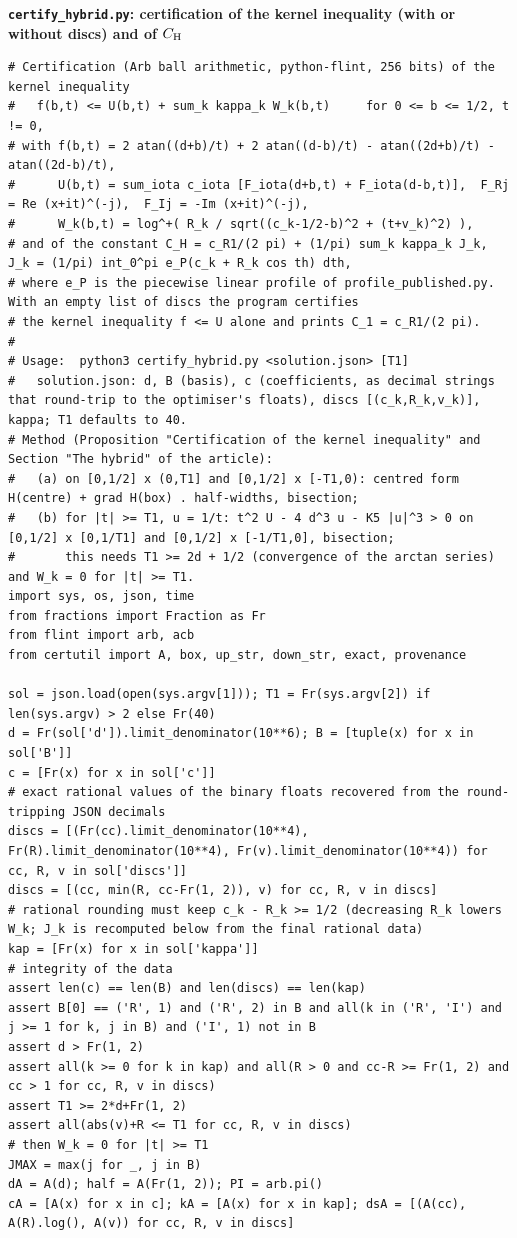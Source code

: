 \documentclass[11pt,reqno]{amsart}
\numberwithin{equation}{section}
\theoremstyle{definition}
\theoremstyle{remark}
\newcommand{\appsub}[1]{\par\medskip\noindent\textbf{#1}\par\nobreak\smallskip}
\begin{document}
\appsub{\texttt{certify\_hybrid.py}: certification of the kernel inequality (with or without discs) and of $C_{\rm H}$}
\label{app:cert_hybrid}
\begin{lstlisting}
# Certification (Arb ball arithmetic, python-flint, 256 bits) of the kernel inequality
#   f(b,t) <= U(b,t) + sum_k kappa_k W_k(b,t)     for 0 <= b <= 1/2, t != 0,
# with f(b,t) = 2 atan((d+b)/t) + 2 atan((d-b)/t) - atan((2d+b)/t) - atan((2d-b)/t),
#      U(b,t) = sum_iota c_iota [F_iota(d+b,t) + F_iota(d-b,t)],  F_Rj = Re (x+it)^(-j),  F_Ij = -Im (x+it)^(-j),
#      W_k(b,t) = log^+( R_k / sqrt((c_k-1/2-b)^2 + (t+v_k)^2) ),
# and of the constant C_H = c_R1/(2 pi) + (1/pi) sum_k kappa_k J_k,  J_k = (1/pi) int_0^pi e_P(c_k + R_k cos th) dth,
# where e_P is the piecewise linear profile of profile_published.py.  With an empty list of discs the program certifies
# the kernel inequality f <= U alone and prints C_1 = c_R1/(2 pi).
#
# Usage:  python3 certify_hybrid.py <solution.json> [T1]
#   solution.json: d, B (basis), c (coefficients, as decimal strings that round-trip to the optimiser's floats), discs [(c_k,R_k,v_k)], kappa; T1 defaults to 40.
# Method (Proposition "Certification of the kernel inequality" and Section "The hybrid" of the article):
#   (a) on [0,1/2] x (0,T1] and [0,1/2] x [-T1,0): centred form H(centre) + grad H(box) . half-widths, bisection;
#   (b) for |t| >= T1, u = 1/t: t^2 U - 4 d^3 u - K5 |u|^3 > 0 on [0,1/2] x [0,1/T1] and [0,1/2] x [-1/T1,0], bisection;
#       this needs T1 >= 2d + 1/2 (convergence of the arctan series) and W_k = 0 for |t| >= T1.
import sys, os, json, time
from fractions import Fraction as Fr
from flint import arb, acb
from certutil import A, box, up_str, down_str, exact, provenance

sol = json.load(open(sys.argv[1])); T1 = Fr(sys.argv[2]) if len(sys.argv) > 2 else Fr(40)
d = Fr(sol['d']).limit_denominator(10**6); B = [tuple(x) for x in sol['B']]
c = [Fr(x) for x in sol['c']]                                           # exact rational values of the binary floats recovered from the round-tripping JSON decimals
discs = [(Fr(cc).limit_denominator(10**4), Fr(R).limit_denominator(10**4), Fr(v).limit_denominator(10**4)) for cc, R, v in sol['discs']]
discs = [(cc, min(R, cc-Fr(1, 2)), v) for cc, R, v in discs]            # rational rounding must keep c_k - R_k >= 1/2 (decreasing R_k lowers W_k; J_k is recomputed below from the final rational data)
kap = [Fr(x) for x in sol['kappa']]
# integrity of the data
assert len(c) == len(B) and len(discs) == len(kap)
assert B[0] == ('R', 1) and ('R', 2) in B and all(k in ('R', 'I') and j >= 1 for k, j in B) and ('I', 1) not in B
assert d > Fr(1, 2)
assert all(k >= 0 for k in kap) and all(R > 0 and cc-R >= Fr(1, 2) and cc > 1 for cc, R, v in discs)
assert T1 >= 2*d+Fr(1, 2)
assert all(abs(v)+R <= T1 for cc, R, v in discs)                         # then W_k = 0 for |t| >= T1
JMAX = max(j for _, j in B)
dA = A(d); half = A(Fr(1, 2)); PI = arb.pi()
cA = [A(x) for x in c]; kA = [A(x) for x in kap]; dsA = [(A(cc), A(R).log(), A(v)) for cc, R, v in discs]


\end{lstlisting}
\end{document}
